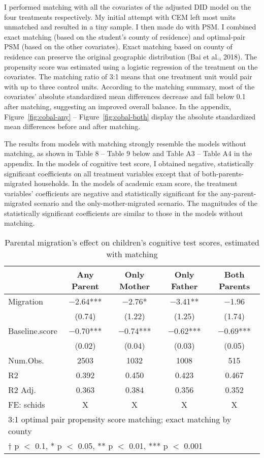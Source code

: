 \documentclass[
  man,floatsintext]{apa7}
\begin{document}
I performed matching with all the covariates of the adjusted DID model on the four treatments respectively. My initial attempt with CEM left most units unmatched and resulted in a tiny sample. I then made do with PSM. I combined exact matching (based on the student's county of residence) and optimal-pair PSM (based on the other covariates). Exact matching based on county of residence can preserve the original geographic distribution (Bai et al., 2018). The propensity score was estimated using a logistic regression of the treatment on the covariates. The matching ratio of 3:1 means that one treatment unit would pair with up to three control units. According to the matching summary, most of the covariates' absolute standardized mean differences decrease and fall below 0.1 after matching, suggesting an improved overall balance. In the appendix, Figure~\ref{fig:cobal-any} -- Figure~\ref{fig:cobal-both} display the absolute standardized mean differences before and after matching.

The results from models with matching strongly resemble the models without matching, as shown in Table 8 -- Table 9 below and Table A3 -- Table A4 in the appendix. In the models of cognitive test score, I obtained negative, statistically significant coefficients on all treatment variables except that of both-parents-migrated households. In the models of academic exam score, the treatment variables' coefficients are negative and statistically significant for the any-parent-migrated scenario and the only-mother-migrated scenario. The magnitudes of the statistically significant coefficients are similar to those in the models without matching.

\begin{table}

\caption{Parental migration’s effect on children’s cognitive test scores, estimated with matching}
\centering
\begin{tabular}[t]{lcccc}
\toprule
  & Any Parent & Only Mother & Only Father & Both Parents\\
\midrule
Migration & \num{-2.64}*** & \num{-2.76}* & \num{-3.41}** & \num{-1.96}\\
 & (\num{0.74}) & (\num{1.22}) & (\num{1.25}) & (\num{1.74})\\
Baseline.score & \num{-0.70}*** & \num{-0.74}*** & \num{-0.62}*** & \num{-0.69}***\\
 & (\num{0.02}) & (\num{0.04}) & (\num{0.03}) & (\num{0.05})\\
\midrule
Num.Obs. & \num{2503} & \num{1032} & \num{1008} & \num{515}\\
R2 & \num{0.392} & \num{0.450} & \num{0.423} & \num{0.467}\\
R2 Adj. & \num{0.363} & \num{0.384} & \num{0.356} & \num{0.352}\\
FE: schids & X & X & X & X\\
\bottomrule
\multicolumn{5}{l}{\rule{0pt}{1em}3:1 optimal pair propensity score matching; exact matching by county}\\
\multicolumn{5}{l}{\rule{0pt}{1em}† p $<$ 0.1, * p $<$ 0.05, ** p $<$ 0.01, *** p $<$ 0.001}\\
\end{tabular}
\end{table}
\end{document}
